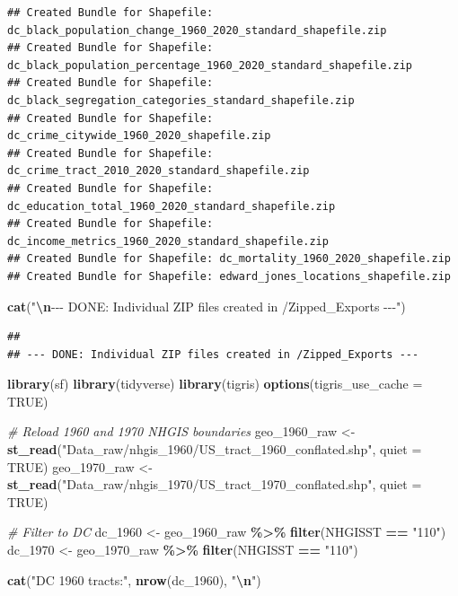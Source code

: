 \documentclass[
]{article}
\newenvironment{Shaded}{\begin{snugshade}}{\end{snugshade}}
\newcommand{\AttributeTok}[1]{\textcolor[rgb]{0.13,0.29,0.53}{#1}}
\newcommand{\CommentTok}[1]{\textcolor[rgb]{0.56,0.35,0.01}{\textit{#1}}}
\newcommand{\ConstantTok}[1]{\textcolor[rgb]{0.56,0.35,0.01}{#1}}
\newcommand{\FunctionTok}[1]{\textcolor[rgb]{0.13,0.29,0.53}{\textbf{#1}}}
\newcommand{\NormalTok}[1]{#1}
\newcommand{\OtherTok}[1]{\textcolor[rgb]{0.56,0.35,0.01}{#1}}
\newcommand{\SpecialCharTok}[1]{\textcolor[rgb]{0.81,0.36,0.00}{\textbf{#1}}}
\newcommand{\StringTok}[1]{\textcolor[rgb]{0.31,0.60,0.02}{#1}}
\begin{document}
\begin{verbatim}
## Created Bundle for Shapefile: dc_black_population_change_1960_2020_standard_shapefile.zip 
## Created Bundle for Shapefile: dc_black_population_percentage_1960_2020_standard_shapefile.zip 
## Created Bundle for Shapefile: dc_black_segregation_categories_standard_shapefile.zip 
## Created Bundle for Shapefile: dc_crime_citywide_1960_2020_shapefile.zip 
## Created Bundle for Shapefile: dc_crime_tract_2010_2020_standard_shapefile.zip 
## Created Bundle for Shapefile: dc_education_total_1960_2020_standard_shapefile.zip 
## Created Bundle for Shapefile: dc_income_metrics_1960_2020_standard_shapefile.zip 
## Created Bundle for Shapefile: dc_mortality_1960_2020_shapefile.zip 
## Created Bundle for Shapefile: edward_jones_locations_shapefile.zip
\end{verbatim}

\begin{Shaded}
\begin{Highlighting}[]
\FunctionTok{cat}\NormalTok{(}\StringTok{"}\SpecialCharTok{\textbackslash{}n}\StringTok{{-}{-}{-} DONE: Individual ZIP files created in /Zipped\_Exports {-}{-}{-}"}\NormalTok{)}
\end{Highlighting}
\end{Shaded}

\begin{verbatim}
## 
## --- DONE: Individual ZIP files created in /Zipped_Exports ---
\end{verbatim}

\begin{Shaded}
\begin{Highlighting}[]
\FunctionTok{library}\NormalTok{(sf)}
\FunctionTok{library}\NormalTok{(tidyverse)}
\FunctionTok{library}\NormalTok{(tigris)}
\FunctionTok{options}\NormalTok{(}\AttributeTok{tigris\_use\_cache =} \ConstantTok{TRUE}\NormalTok{)}

\CommentTok{\# Reload 1960 and 1970 NHGIS boundaries}
\NormalTok{geo\_1960\_raw }\OtherTok{\textless{}{-}} \FunctionTok{st\_read}\NormalTok{(}\StringTok{"Data\_raw/nhgis\_1960/US\_tract\_1960\_conflated.shp"}\NormalTok{, }\AttributeTok{quiet =} \ConstantTok{TRUE}\NormalTok{)}
\NormalTok{geo\_1970\_raw }\OtherTok{\textless{}{-}} \FunctionTok{st\_read}\NormalTok{(}\StringTok{"Data\_raw/nhgis\_1970/US\_tract\_1970\_conflated.shp"}\NormalTok{, }\AttributeTok{quiet =} \ConstantTok{TRUE}\NormalTok{)}

\CommentTok{\# Filter to DC}
\NormalTok{dc\_1960 }\OtherTok{\textless{}{-}}\NormalTok{ geo\_1960\_raw }\SpecialCharTok{\%\textgreater{}\%} \FunctionTok{filter}\NormalTok{(NHGISST }\SpecialCharTok{==} \StringTok{"110"}\NormalTok{)}
\NormalTok{dc\_1970 }\OtherTok{\textless{}{-}}\NormalTok{ geo\_1970\_raw }\SpecialCharTok{\%\textgreater{}\%} \FunctionTok{filter}\NormalTok{(NHGISST }\SpecialCharTok{==} \StringTok{"110"}\NormalTok{)}

\FunctionTok{cat}\NormalTok{(}\StringTok{"DC 1960 tracts:"}\NormalTok{, }\FunctionTok{nrow}\NormalTok{(dc\_1960), }\StringTok{"}\SpecialCharTok{\textbackslash{}n}\StringTok{"}\NormalTok{)}
\end{Highlighting}
\end{Shaded}
\end{document}
